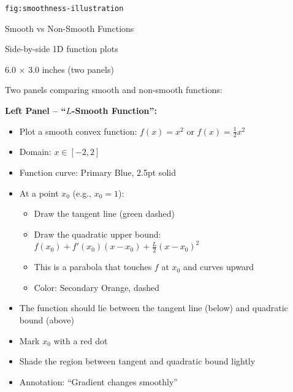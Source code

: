 \documentclass[12pt]{article}
\begin{document}
\begin{description}[style=nextline, leftmargin=0pt]
    \item[Figure ID] \texttt{fig:smoothness-illustration}
    \item[Title] Smooth vs Non-Smooth Functions
    \item[Type] Side-by-side 1D function plots
    \item[Size] 6.0 $\times$ 3.0 inches (two panels)

    \item[Visual Description]
    Two panels comparing smooth and non-smooth functions:

    \textbf{Left Panel -- ``$L$-Smooth Function'':}
    \begin{itemize}
        \item Plot a smooth convex function: $f(x) = x^2$ or $f(x) = \frac{1}{2}x^2$
        \item Domain: $x \in [-2, 2]$
        \item Function curve: Primary Blue, 2.5pt solid
        \item At a point $x_0$ (e.g., $x_0 = 1$):
        \begin{itemize}
            \item Draw the tangent line (green dashed)
            \item Draw the quadratic upper bound: $f(x_0) + f'(x_0)(x - x_0) + \frac{L}{2}(x-x_0)^2$
            \item This is a parabola that touches $f$ at $x_0$ and curves upward
            \item Color: Secondary Orange, dashed
        \end{itemize}
        \item The function should lie between the tangent line (below) and quadratic bound (above)
        \item Mark $x_0$ with a red dot
        \item Shade the region between tangent and quadratic bound lightly
        \item Annotation: ``Gradient changes smoothly''
    \end{itemize}


\end{description}
\end{document}
